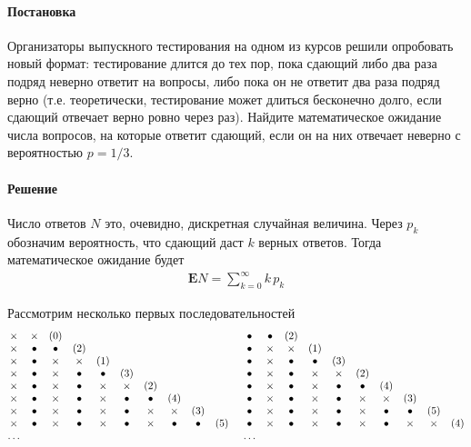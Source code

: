 \documentclass[%
	11pt,
	a4paper,
	utf8,
		]{article}
\begin{document}
\paragraph{Постановка} Организаторы выпускного тестирования на одном из курсов решили опробовать новый формат: тестирование длится до тех пор, пока сдающий либо два раза подряд неверно ответит на вопросы, либо пока он не ответит два раза подряд верно (т.е. теоретически, тестирование может длиться бесконечно долго, если сдающий отвечает верно ровно через раз). Найдите математическое ожидание числа вопросов, на которые ответит сдающий, если он на них отвечает неверно с вероятностью $ p = 1/3 $.

\paragraph{Решение}

Число ответов $ N $ это, очевидно, дискретная случайная величина. Через $ p_k $ обозначим вероятность, что сдающий даст $ k $ верных ответов. Тогда математическое ожидание будет
\begin{align*}
	\mathbf{E}N = \sum_{k=0}^{\infty} k \, p_k
\end{align*}

Рассмотрим несколько первых последовательностей
\begin{align*}
\begin{matrix}
\times & \times & (0) \\
\times & \bullet & \bullet & (2) \\
\times & \bullet & \times & \times & (1) \\
\times & \bullet & \times & \bullet & \bullet & (3) \\
\times & \bullet & \times & \bullet & \times & \times & (2) \\
\times & \bullet & \times & \bullet & \times & \bullet & \bullet & (4) \\
\times & \bullet & \times & \bullet & \times & \bullet & \times & \times & (3) \\
\times & \bullet & \times & \bullet & \times & \bullet & \times & \bullet & \bullet & (5) \\
\ldots
\end{matrix}
\hspace*{5mm}
\begin{matrix}
	\bullet & \bullet & (2) \\
	\bullet & \times & \times & (1) \\
	\bullet & \times & \bullet & \bullet & (3) \\
	\bullet & \times & \bullet & \times & \times & (2) \\
	\bullet & \times & \bullet & \times & \bullet & \bullet & (4) \\
	\bullet & \times & \bullet & \times & \bullet & \times & \times & (3) \\
	\bullet & \times & \bullet & \times & \bullet & \times & \bullet & \bullet & (5) \\
	\bullet & \times & \bullet & \times & \bullet & \times & \bullet & \times & \times & (4) \\
	\ldots
\end{matrix}
\end{align*}
\end{document}

